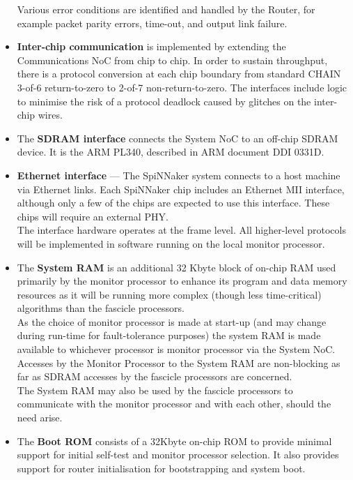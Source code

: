 \documentclass[a4paper, 11pt]{article}
\begin{document}
\begin{itemize}
	Various error conditions are identified and handled by the Router, for example packet parity errors, time-out, and output link failure.
	\item \textbf{Inter-chip  communication}  is  implemented  by  extending  the Communications NoC  from  chip  to chip.  In  order  to  sustain  throughput,  there  is  a  protocol  conversion  at  each  chip  boundary  from standard CHAIN 3-of-6 return-to-zero to 2-of-7 non-return-to-zero. The interfaces include logic to minimise the risk of a protocol deadlock caused by glitches on the inter-chip wires.
	\item The \textbf{SDRAM  interface}  connects  the System NoC  to  an off-chip SDRAM device.  It  is  the ARM PL340, described in ARM document DDI 0331D.
	\item \textbf{Ethernet interface} --- The  SpiNNaker  system  connects  to  a  host  machine  via  Ethernet  links.  Each  SpiNNaker  chip includes  an  Ethernet MII  interface,  although  only  a  few  of  the  chips  are  expected  to  use  this interface. These chips will require an external PHY.\\
	The interface hardware operates at the frame level. All higher-level protocols will be implemented in software running on the local monitor processor.
	\item The \textbf{System RAM} is an additional 32 Kbyte block of on-chip RAM used primarily by the monitor processor to enhance its program and data memory resources as it will be running more complex (though less time-critical) algorithms than the fascicle processors.\\
	As the choice of monitor processor is made at start-up (and may change during run-time for fault-tolerance  purposes)  the  system  RAM  is  made  available  to  whichever  processor  is  monitor processor via  the System NoC. Accesses by  the Monitor Processor  to  the System RAM are non-blocking as far as SDRAM accesses by the fascicle processors are concerned.\\
	The System RAM may also be used by  the fascicle processors to communicate with  the monitor processor and with each other, should the need arise.
	\item The \textbf{Boot ROM} consists of a 32Kbyte on-chip ROM to provide minimal support for initial self-test and monitor processor selection. It also provides support for router initialisation for bootstrapping and system boot.
\end{itemize}
\end{document}
